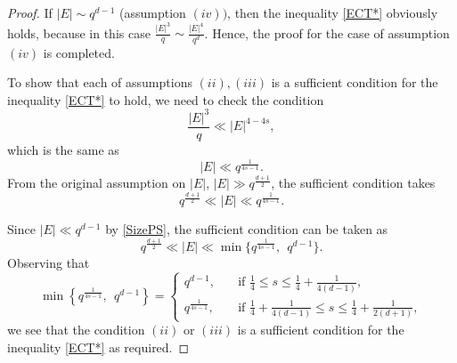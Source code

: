 \documentclass[10pt,a4paper]{amsart}
\begin{document}
\begin{proof}
If $|E|\sim q^{d-1}$ (assumption $(iv))$, then the inequality \eqref{ECT*} obviously holds, because in this case $\frac{|E|^3}{q}\sim \frac{|E|^4}{q^d}$.
Hence,  the proof for the case of assumption $(iv)$ is completed.

To show that each of assumptions $(ii), (iii)$ is a sufficient condition for the inequality \eqref{ECT*} to hold, we need to check the condition $$\frac{|E|^3}{q} \ll |E|^{4-4s},$$
which is the same as 
$$ |E|\ll q^{\frac{1}{4s-1}}.$$
From the original assumption on $|E|$, $|E|\gg q^{\frac{d+1}{2}}$, the sufficient condition takes
$$  q^{\frac{d+1}{2}} \ll |E|\ll q^{\frac{1}{4s-1}}.$$

Since $|E|\ll q^{d-1}$ by \eqref{SizePS},    the sufficient condition  can be taken as
$$  q^{\frac{d+1}{2}} \ll |E|\ll \min\{q^{\frac{1}{4s-1}},  ~~q^{d-1}\}.$$
Observing that 
\[ \min\left\{q^{\frac{1}{4s-1}},  ~~q^{d-1}\right\} = \begin{cases}
    q^{d-1}, \quad                  &\text{if } \frac{1}{4} \le s \le \frac{1}{4}+\frac{1}{4(d-1)},\\
     q^{\frac{1}{4s-1}}, \quad     & \text{if }  \frac{1}{4}+\frac{1}{4(d-1)} \le s \le \frac{1}{4}+ \frac{1}{2(d+1)}, 
    \end{cases}\]
we see that the condition $(ii)$ or $(iii)$ is a sufficient condition for the inequality \eqref{ECT*} as required.
\end{proof}
\end{document}
